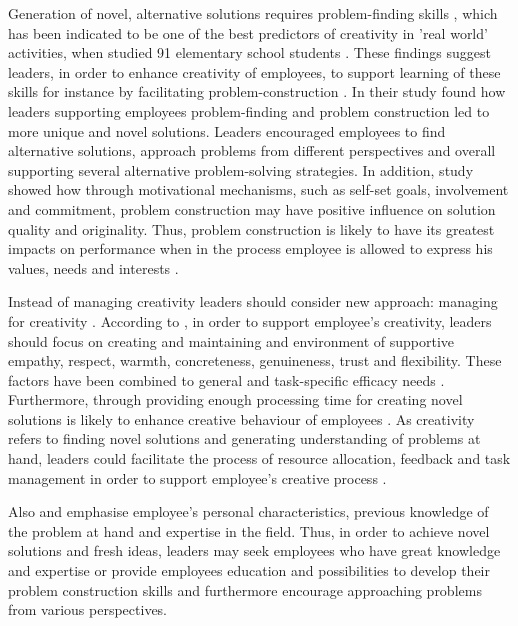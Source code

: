 Generation of novel, alternative solutions requires problem-finding skills \citep{runco1988problem}, which has been indicated to be one of the best predictors of creativity in 'real world' activities, when studied 91 elementary school students \citep{runco1990evaluating}. These findings suggest leaders, in order to enhance creativity of employees, to support learning of these skills for instance by facilitating problem-construction \citep{redmond1993putting}. In their study \citet{redmond1993putting} found how leaders supporting employees problem-finding and problem construction led to more unique and novel solutions. Leaders encouraged employees to find alternative solutions, approach problems from different perspectives and overall supporting several alternative problem-solving strategies. In addition, study showed how through motivational mechanisms, such as self-set goals, involvement and commitment, problem construction may have positive influence on solution quality and originality. Thus, problem construction is likely to have its greatest impacts on performance when in the process employee is allowed to express his values, needs and interests \citep{redmond1993putting}.

Instead of managing creativity leaders should consider new approach: managing for creativity \citep{amabile2008creativity}. According to \citet{isaksen1983toward}, in order to support employee's creativity, leaders should focus on creating and maintaining and environment of supportive empathy, respect, warmth, concreteness, genuineness, trust and flexibility. These factors have been combined to general and task-specific efficacy needs \citep{mumford1988creativity}. Furthermore, through providing enough processing time for creating novel solutions is likely to enhance creative behaviour of employees \citep{isaksen1983toward}. As creativity refers to finding novel solutions and generating understanding of problems at hand, leaders could facilitate the process of resource allocation, feedback and task management in order to support employee's creative process \citep{mumford1988creativity}. 

Also \citet{mumford1988creativity} and \citet{redmond1993putting} emphasise employee's personal characteristics, previous knowledge of the problem at hand and expertise in the field. Thus, in order to achieve novel solutions and fresh ideas, leaders may seek employees who have great knowledge and expertise or provide employees education and possibilities to develop their problem construction skills and furthermore encourage approaching problems from various perspectives. \citep{redmond1993putting} 

